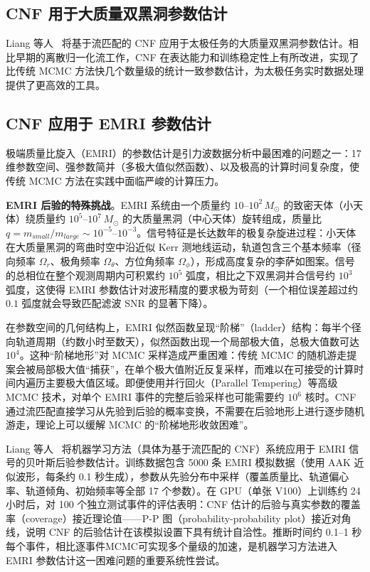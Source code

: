 \subsection{CNF 用于大质量双黑洞参数估计}

Liang 等人~\cite{liang2024cnfmbhb} 将基于流匹配的 CNF 应用于太极任务的大质量双黑洞参数估计。相比早期的离散归一化流工作，CNF 在表达能力和训练稳定性上有所改进，实现了比传统 MCMC 方法快几个数量级的统计一致参数估计，为太极任务实时数据处理提供了更高效的工具。

\subsection{CNF 应用于 EMRI 参数估计}

极端质量比旋入（EMRI）的参数估计是引力波数据分析中最困难的问题之一：17 维参数空间、强参数简并（多极大值似然函数）、以及极高的计算时间复杂度，使传统 MCMC 方法在实践中面临严峻的计算压力。

\textbf{EMRI 后验的特殊挑战}。EMRI 系统由一个质量约 $10$--$10^2\,M_\odot$ 的致密天体（小天体）绕质量约 $10^5$--$10^7\,M_\odot$ 的大质量黑洞（中心天体）旋转组成，质量比 $q = m_{small}/m_{large} \sim 10^{-5}$--$10^{-3}$。信号特征是长达数年的极复杂旋进过程：小天体在大质量黑洞的弯曲时空中沿近似 Kerr 测地线运动，轨道包含三个基本频率（径向频率 $\Omega_r$、极角频率 $\Omega_\theta$、方位角频率 $\Omega_\phi$），形成高度复杂的李萨如图案。信号的总相位在整个观测周期内可积累约 $10^5$ 弧度，相比之下双黑洞并合信号约 $10^3$ 弧度，这使得 EMRI 参数估计对波形精度的要求极为苛刻（一个相位误差超过约 $0.1$ 弧度就会导致匹配滤波 SNR 的显著下降）。

在参数空间的几何结构上，EMRI 似然函数呈现“阶梯”（ladder）结构：每半个径向轨道周期（约数小时至数天），似然函数出现一个局部极大值，总极大值数可达 $10^4$。这种“阶梯地形”对 MCMC 采样造成严重困难：传统 MCMC 的随机游走提案会被局部极大值“捕获”，在单个极大值附近反复采样，而难以在可接受的计算时间内遍历主要极大值区域。即便使用并行回火（Parallel Tempering）等高级 MCMC 技术，对单个 EMRI 事件的完整后验采样也可能需要约 $10^6$ 核时。CNF 通过流匹配直接学习从先验到后验的概率变换，不需要在后验地形上进行逐步随机游走，理论上可以缓解 MCMC 的“阶梯地形收敛困难”。

Liang 等人~\cite{liang2024cnfemri} 将机器学习方法（具体为基于流匹配的 CNF）系统应用于 EMRI 信号的贝叶斯后验参数估计。训练数据包含 5000 条 EMRI 模拟数据（使用 AAK 近似波形，每条约 0.1 秒生成），参数从先验分布中采样（覆盖质量比、轨道偏心率、轨道倾角、初始频率等全部 17 个参数）。在 GPU（单张 V100）上训练约 24 小时后，对 100 个独立测试事件的评估表明：CNF 估计的后验与真实参数的覆盖率（coverage）接近理论值——P-P 图（probability-probability plot）接近对角线，说明 CNF 的后验估计在该模拟设置下具有统计自洽性。推断时间约 0.1--1 秒每个事件，相比逐事件MCMC可实现多个量级的加速，是机器学习方法进入 EMRI 参数估计这一困难问题的重要系统性尝试。

